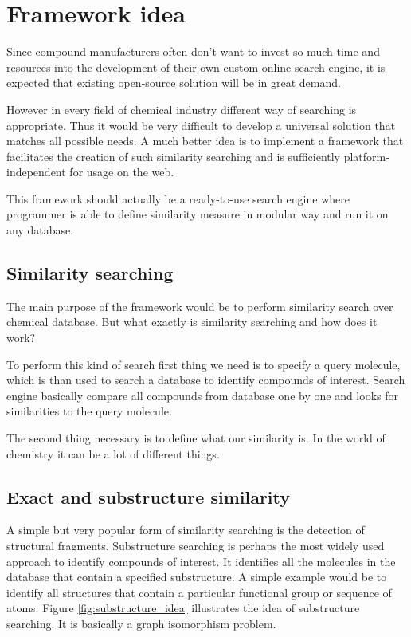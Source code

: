 \documentclass[thesis=M,english]{FITthesis}[2012/10/20]
\begin{document}
\section{Framework idea}
Since compound manufacturers often don’t want to invest so much time and resources into the development of their own custom online search engine, it is expected that existing open-source solution will be in great demand.

However in every field of chemical industry different way of searching is appropriate. Thus it would be very difficult to develop a universal solution that matches all possible needs. A much better idea is to implement a framework that facilitates the creation of such similarity searching and is sufficiently platform-independent for usage on the web. 

This framework should actually be a ready-to-use search engine where programmer is able to define similarity measure in modular way and run it on any database.

\subsection{Similarity searching}
The main purpose of the framework would be to perform similarity search over chemical database. But what exactly is similarity searching and how does it work?

To perform this kind of search first thing we need is to specify a query molecule, which is than used to search a database to identify compounds of interest. Search engine basically compare all compounds from database one by one and looks for similarities to the query molecule. 

The second thing necessary is to define what our similarity is. In the world of chemistry it can be a lot of different things. 

\subsection{Exact and substructure similarity}
A simple but very popular form of similarity searching is the detection of structural fragments. Substructure searching is perhaps the most widely used approach to identify compounds of interest. It identifies all the molecules in the database that contain a specified substructure. A simple example would be to identify all structures that contain a particular functional group or sequence of atoms. Figure \ref{fig:substructure_idea} illustrates the idea of substructure searching. It is basically a graph isomorphism problem.
\end{document}
